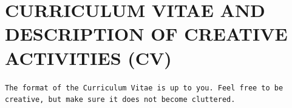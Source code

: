 \section*{\MakeUppercase{Curriculum Vitae and Description of Creative Activities (CV)}}
\texttt{The format of the Curriculum Vitae is up to you. Feel free to be creative, but make sure it does not become cluttered. \smiley}
